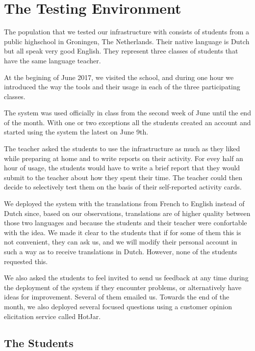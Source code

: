 
\newpage
\section{The Testing Environment}
\label{sec:demographics}

The population that we tested our infrastructure with consists of \stcnt  students from a public highschool in Groningen, The Netherlands. Their native language is Dutch but all speak very good English. They represent three classes of students that have the same language teacher.

At the begining of June 2017, we visited the school, and during one hour we introduced the way the tools and their usage in each of the three participating classes.

The system was used officially in class from the second week of June until the end of the month. With one or two exceptions all the students created an account and started using the system the latest on June 9th. 

The teacher asked the students to use the infrastructure as much as they liked while preparing at home and to write reports on their activity. For evey half an hour of usage, the students would have to write a brief report that they would submit to the teacher about how they spent their time. The teacher could then decide to selectively test them on the basis of their self-reported activity cards.

We deployed the system with the translations from French to English instead of Dutch since, based on our observations, translations are of higher quality between those two languages and because the students and their teacher were confortable with the idea. We made it clear to the students that if for some of them this is not convenient, they can ask us, and we will modify their personal account in such a way as to receive translations in Dutch. However, none of the students requested this.

We also asked the students to feel invited to send us feedback at any time during the deployment of the system if they encounter problems, or alternatively have ideas for improvement. Several of them emailed us. Towards the end of the month, we also deployed several focused questions using a customer opinion elicitation service called HotJar. 

\subsection{The Students}

